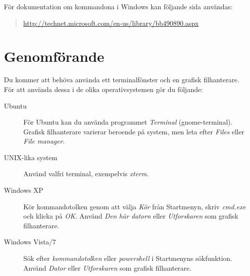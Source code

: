 \documentclass[11pt,a4paper]{miunasgn}
\begin{document}
För dokumentation om kommandona i Windows kan följande sida användas:
\begin{quote}
	\url{http://technet.microsoft.com/en-us/library/bb490890.aspx}
\end{quote}


\section{Genomförande}
\label{sec:Genomforande}
\noindent
Du kommer att behöva använda ett terminalfönster och en grafisk filhanterare.
För att använda dessa i de olika operativsystemen gör du följande:
\begin{description}
	\item[Ubuntu] För Ubuntu kan du använda programmet \emph{Terminal} 
		(gnome-terminal).
		Grafisk filhanterare varierar beroende på system, men leta efter 
		\emph{Files} eller \emph{File manager}.
	\item[UNIX-lika system] Använd valfri terminal, exempelvis \emph{xterm}.
	\item[Windows XP] Kör kommandotolken genom att välja \emph{Kör} från
		Startmenyn, skriv \emph{cmd.exe} och klicka på \emph{OK}.
		Använd \emph{Den här datorn} eller \emph{Utforskaren} som grafisk
		filhanterare.
	\item[Windows Vista/7] Sök efter \emph{kommandotolken} eller
		\emph{powershell} i Startmenyns sökfunktion.
		Använd \emph{Dator} eller \emph{Utforskaren} som grafisk filhanterare.
\end{description}
\end{document}
